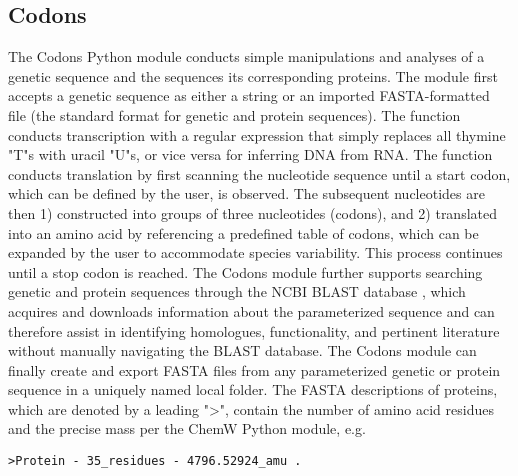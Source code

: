 \subsection{Codons}
The Codons Python module conducts simple manipulations and analyses of a genetic sequence and the sequences its corresponding proteins. The module first accepts a genetic sequence as either a string or an imported FASTA-formatted file \cite{Lipman1985RapidSearches} (the standard format for genetic and protein sequences). The  function conducts transcription with a regular expression \cite{Thompson1968ProgrammingAlgorithm} that simply replaces all thymine "T"s with uracil "U"s, or vice versa for inferring DNA from RNA. The  function conducts translation by first scanning the nucleotide sequence until a start codon, which can be defined by the user, is observed. The subsequent nucleotides are then 1) constructed into groups of three nucleotides (codons), and 2) translated into an amino acid by referencing a predefined table of codons, which can be expanded by the user to accommodate species variability. This process continues until a stop codon is reached. The Codons module further supports searching genetic and protein sequences through the NCBI BLAST database \cite{Johnson2008NCBIInterface.,Price2019CuratedGenomes}, which acquires and downloads information about the parameterized sequence and can therefore assist in identifying homologues, functionality, and pertinent literature without manually navigating the BLAST database. The Codons module can finally create and export FASTA files from any parameterized genetic or protein sequence in a uniquely named local folder. The FASTA descriptions of proteins, which are denoted by a leading ">", contain the number of amino acid residues and the precise mass per the ChemW Python module, e.g. 
\begin{lstlisting}[label = fasta_protein]
>Protein - 35_residues - 4796.52924_amu .
\end{lstlisting}

